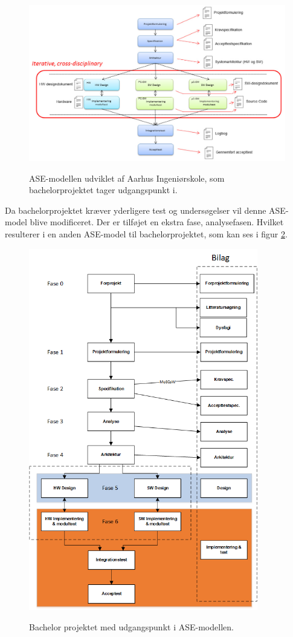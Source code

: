 \begin{figure}[H] 
\centering
{\includegraphics[width=\linewidth]
{Figure/asemodel}}
\caption{ASE-modellen udviklet af Aarhus Ingeniørskole, som bachelorprojektet tager udgangspunkt i.}
\label{asemodel}
\end{figure}



Da bachelorprojektet kræver yderligere test og undersøgelser vil denne ASE-model blive modificeret. Der er tilføjet en ekstra fase, analysefasen. Hvilket resulterer i en anden ASE-model til bachelorprojektet, som kan ses i figur \ref{procesVoresASE}.


\begin{figure}[H] 
\centering
{\includegraphics[width=10cm]
{Figure/procesVoresASE}}
\caption{Bachelor projektet med udgangspunkt i ASE-modellen.}
\label{procesVoresASE}
\end{figure}

